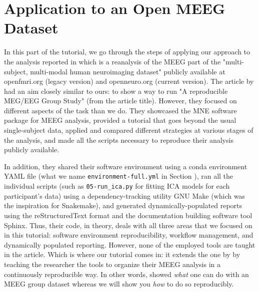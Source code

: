 \documentclass[a4paper,man,floatsintext,natbib]{apa6}
\begin{document}
\section{Application to an Open MEEG Dataset}
In this part of the tutorial, we go through the steps of applying our approach to the analysis reported in \cite{jasReproducibleMEGEEG2018a} which is a reanalysis of the MEEG part of the "multi-subject, multi-modal human neuroimaging dataset" \citep{wakemanMultisubjectMultimodalHuman2015} publicly available at openfmri.org (legacy version) and openneuro.org (current version). The article by \cite{jasReproducibleMEGEEG2018a} had an aim closely similar to ours: to show a way to run "A reproducible MEG/EEG Group Study" (from the article title). However, they focused on different aspects of the task than we do. They showcased the MNE software package for MEEG analysis, provided a tutorial that goes beyond the usual single-subject data, applied and compared different strategies at various stages of the analysis, and made all the scripts necessary to reproduce their analysis publicly available. 

In addition, they shared their software environment using a conda environment YAML file (what we name \verb|environment-full.yml| in Section ), ran all the individual scripts (such as \verb|05-run_ica.py| for fitting ICA models for each participant's data) using a dependency-tracking utility GNU Make (which was the inspiration for Snakemake), and generated dynamically-populated reports using the reStructuredText format and the documentation building software tool Sphinx. Thus, their code, in theory, deals with all three areas that we focused on in this tutorial: software environment reproducibility, workflow management, and dynamically populated reporting. However, none of the employed tools are taught in the article. Which is where our tutorial comes in: it extends the one by \cite{jasReproducibleMEGEEG2018a} by teaching the researcher the tools to organize their MEEG analysis in a continuously reproducible way. In other words, \cite{jasReproducibleMEGEEG2018a} showed \emph{what} one can do with an MEEG group dataset whereas we will show you \emph{how} to do so reproducibly.
\end{document}
